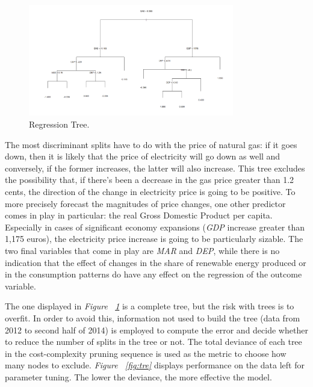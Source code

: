 \documentclass[a4paper,12pt]{book}
\begin{document}
\begin{figure}[tb]
\begin{center}
\captionsetup{justification=centering}
\includegraphics[width=0.8\textwidth]{Images/plot.png}
\caption{Regression Tree.}
\label{fig:plot}
\end{center}
\end{figure}

The most discriminant splits have to do with the price of natural gas: if it goes down, then it is likely that the price of electricity will go down as well and conversely, if the former increases, the latter will also increase. This tree excludes the possibility that, if there's been a decrease in the gas price greater than 1.2 cents, the direction of the change in electricity price is going to be positive. To more precisely forecast the magnitudes of price changes, one other predictor comes in play in particular: the real Gross Domestic Product per capita. Especially in cases of significant economy expansions (\textit{GDP} increase greater than 1,175 euros), the electricity price increase is going to be particularly sizable. The two final variables that come in play are \textit{MAR} and \textit{DEP}, while there is no indication that the effect of changes in the share of renewable energy produced or in the consumption patterns do have any effect on the regression of the outcome variable.

The one displayed in \textit{Figure ~\ref{fig:plot}} is a complete tree, but the risk with trees is to overfit. In order to avoid this, information not used to build the tree (data from 2012 to second half of 2014) is employed to compute the error and decide whether to reduce the number of splits in the tree or not. The total deviance of each tree in the cost-complexity pruning sequence is used as the metric to choose how many nodes to exclude. \textit{Figure ~\ref{fig:tre}} displays performance on the data left for parameter tuning. The lower the deviance, the more effective the model.
\end{document}
